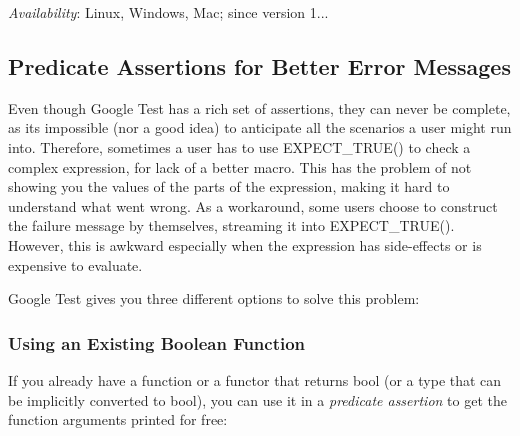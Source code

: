 {\itshape Availability}\+: Linux, Windows, Mac; since version 1...

\subsection*{Predicate Assertions for Better Error Messages}

Even though Google Test has a rich set of assertions, they can never be complete, as it\textquotesingle{}s impossible (nor a good idea) to anticipate all the scenarios a user might run into. Therefore, sometimes a user has to use {\ttfamily E\+X\+P\+E\+C\+T\+\_\+\+T\+R\+U\+E()} to check a complex expression, for lack of a better macro. This has the problem of not showing you the values of the parts of the expression, making it hard to understand what went wrong. As a workaround, some users choose to construct the failure message by themselves, streaming it into {\ttfamily E\+X\+P\+E\+C\+T\+\_\+\+T\+R\+U\+E()}. However, this is awkward especially when the expression has side-\/effects or is expensive to evaluate.

Google Test gives you three different options to solve this problem\+:

\subsubsection*{Using an Existing Boolean Function}

If you already have a function or a functor that returns {\ttfamily bool} (or a type that can be implicitly converted to {\ttfamily bool}), you can use it in a {\itshape predicate assertion} to get the function arguments printed for free\+:

